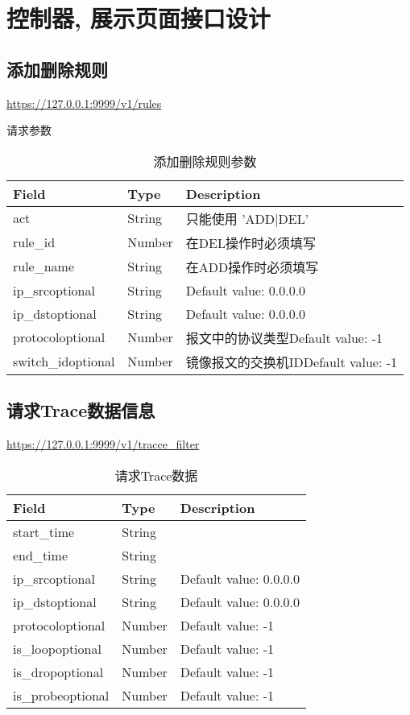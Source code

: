 \section{控制器, 展示页面接口设计}

\subsection{添加删除规则}

\url{https://127.0.0.1:9999/v1/rules}

请求参数

\begin{table}[]
    \centering
    \caption{添加删除规则参数}
    \label{tbl:add_del_rule}
    \begin{tabular}{lll}
    Field              & Type   & Description                 \\ \hline
    act                & String & 只能使用 'ADD|DEL'              \\
    rule\_id           & Number & 在DEL操作时必须填写                 \\
    rule\_name         & String & 在ADD操作时必须填写                 \\
    ip\_srcoptional    & String & Default value: 0.0.0.0      \\
    ip\_dstoptional    & String & Default value: 0.0.0.0      \\
    protocoloptional   & Number & 报文中的协议类型Default value: -1   \\
    switch\_idoptional & Number & 镜像报文的交换机IDDefault value: -1 \\ \hline
    \end{tabular}
\end{table}

\subsection{请求Trace数据信息}

\url{https://127.0.0.1:9999/v1/tracce_filter}

\begin{table}[]
    \centering
    \caption{请求Trace数据}
    \label{tbl:get_trace}
    \begin{tabular}{lll}
    Field             & Type   & Description            \\ \hline
    start\_time       & String &                        \\
    end\_time         & String &                        \\
    ip\_srcoptional   & String & Default value: 0.0.0.0 \\
    ip\_dstoptional   & String & Default value: 0.0.0.0 \\
    protocoloptional  & Number & Default value: -1      \\
    is\_loopoptional  & Number & Default value: -1      \\
    is\_dropoptional  & Number & Default value: -1      \\
    is\_probeoptional & Number & Default value: -1      \\ \hline
    \end{tabular}
\end{table}


